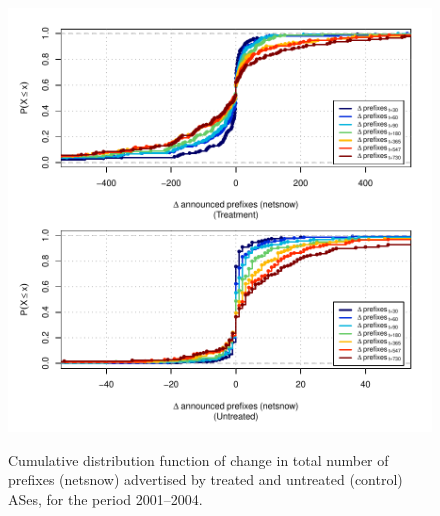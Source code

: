 \begin{figure}[H]
\begin{centering}
\begin{singlespace}
    \includegraphics[width=6in]{figures/behavior-netsnow-2001_2004-corr.pdf}
    \vspace{-2em}\\
    \caption{Cumulative distribution function of change in total number of
    prefixes (netsnow) advertised by treated and untreated (control) ASes, for
    the period 2001--2004.}
\end{singlespace}
\end{centering}
\end{figure}
